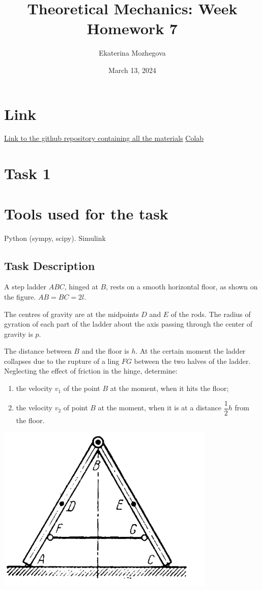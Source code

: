 \documentclass{article}
\title{Theoretical Mechanics: Week Homework 7}
\author{Ekaterina Mozhegova}
\date{March 13, 2024}
\begin{document}
\maketitle

\section{Link}
\href{https://github.com/illusoryTwin/Theoretical_mechanics/tree/master/hw7}{Link to the github repository containing all the materials}
\href{https://colab.research.google.com/drive/1N4Wz00wVzvYmVSC5-sXymZ0KxCkiNkbR?usp=sharing}{Colab}
\section{Task 1}

\section{Tools used for the task}
Python (sympy, scipy). Simulink

\subsection{Task Description}

A step ladder $ABC$, hinged at $B$, rests on a smooth horizontal floor, as shown on the figure. $AB=BC=2l$.

The centres of gravity are at the midpoints $D$ and $E$ of the rods. The radius of gyration of each part of the ladder about the axis passing through the center of gravity is $p$.

The distance between $B$ and the floor is $h$. At the certain moment the ladder collapses due to the rupture of a ling $FG$ between the two halves of the ladder. Neglecting the effect of friction in the hinge, determine:
\begin{enumerate}
  \item the velocity $v_1$ of the point $B$ at the moment, when it hits the floor;
  \item the velocity $v_2$ of point $B$ at the moment, when it is at a distance $\dfrac{1}{2}h$ from the floor.
\end{enumerate}

\includegraphics*[scale=0.5]{task_scheme/hw7_task1.png}{\centering}
\end{document}

